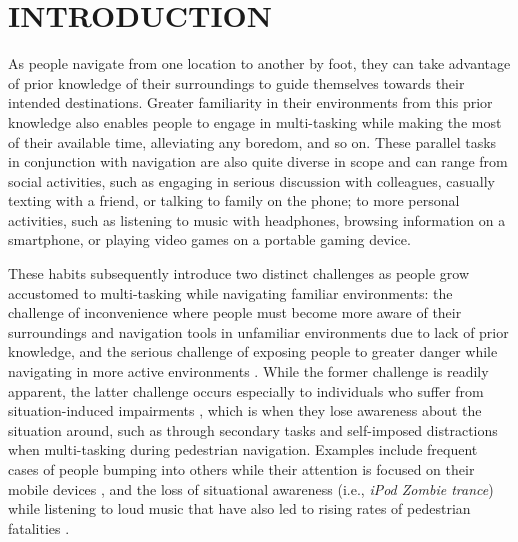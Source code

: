 \documentclass{sigchi}
\begin{document}



\section{INTRODUCTION}
As people navigate from one location to another by foot, they can take advantage of prior knowledge of their surroundings to guide themselves towards their intended destinations.  Greater familiarity in their environments from this prior knowledge also enables people to engage in multi-tasking while making the most of their available time, alleviating any boredom, and so on.  These parallel tasks in conjunction with navigation are also quite diverse in scope and can range from social activities, such as engaging in serious discussion with colleagues, casually texting with a friend, or talking to family on the phone; to more personal activities, such as listening to music with headphones, browsing information on a smartphone, or playing video games on a portable gaming device.

These habits subsequently introduce two distinct challenges as people grow accustomed to multi-tasking while navigating familiar environments: the challenge of inconvenience where people must become more aware of their surroundings and navigation tools in unfamiliar environments due to lack of prior knowledge, and the serious challenge of exposing people to greater danger while navigating in more active environments \cite{2010_Madden_PewResearch}.  While the former challenge is readily apparent, the latter challenge occurs especially to individuals who suffer from situation-induced impairments \cite{2007_Jupp_UAHCI}, which is when they lose awareness about the situation around, such as through secondary tasks and self-imposed distractions when multi-tasking during pedestrian navigation.  Examples include frequent cases of people bumping into others while their attention is focused on their mobile devices \cite{2010_Madden_PewResearch}, and the loss of situational awareness (i.e., \textit{iPod Zombie trance}) while listening to loud music that have also led to rising rates of pedestrian fatalities \cite{2012_Pielot_CHI}.
\end{document}
